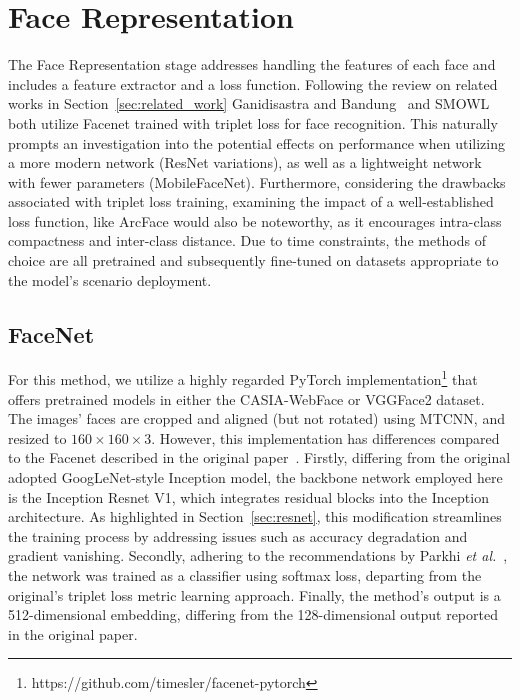 \documentclass[class=report, crop=false, a4paper, 12pt]{standalone}
\begin{document}
\section{Face Representation}
The Face Representation stage addresses handling the features of each face and includes a feature extractor and a loss function. Following the review on related works in Section~\ref{sec:related_work} Ganidisastra and Bandung~\autocite{ganidisastraIncrementalTrainingDeep2021} and SMOWL~\autocite{labayenOnlineStudentAuthentication2021} both utilize Facenet trained with triplet loss for face recognition. This naturally prompts an investigation into the potential effects on performance when utilizing a more modern network (ResNet variations), as well as a lightweight network with fewer parameters (MobileFaceNet). Furthermore, considering the drawbacks associated with triplet loss training, examining the impact of a well-established loss function, like ArcFace would also be noteworthy, as it encourages intra-class compactness and inter-class distance. Due to time constraints, the methods of choice are all pretrained and subsequently fine-tuned on datasets appropriate to the model's scenario deployment.

\subsection{FaceNet}
For this method, we utilize a highly regarded PyTorch implementation\footnote{https://github.com/timesler/facenet-pytorch} that offers pretrained models in either the CASIA-WebFace or VGGFace2 dataset. The images' faces are cropped and aligned (but not rotated) using MTCNN, and resized to $160\times160\times3$. However, this implementation has differences compared to the Facenet described in the original paper~\autocite{schroffFaceNetUnifiedEmbedding2015}. Firstly, differing from the original adopted GoogLeNet-style Inception model, the backbone network employed here is the Inception Resnet V1, which integrates residual blocks into the Inception architecture. As highlighted in Section~\ref{sec:resnet}, this modification streamlines the training process by addressing issues such as accuracy degradation and gradient vanishing. Secondly, adhering to the recommendations by Parkhi \textit{et al.}~\autocite{parkhiDeepFaceRecognition2015}, the network was trained as a classifier using softmax loss, departing from the original's triplet loss metric learning approach. Finally, the method's output is a 512-dimensional embedding, differing from the 128-dimensional output reported in the original paper.
\end{document}

